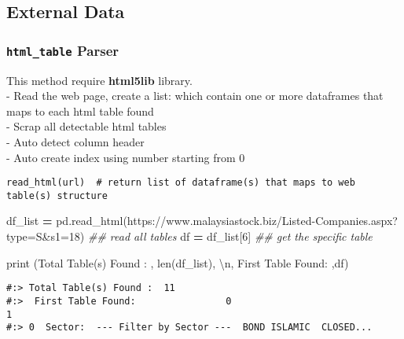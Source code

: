 \documentclass[
]{book}
\newenvironment{Shaded}{\begin{snugshade}}{\end{snugshade}}
\newcommand{\BuiltInTok}[1]{#1}
\newcommand{\CharTok}[1]{\textcolor[rgb]{0.5,0.5,0.5}{#1}}
\newcommand{\CommentTok}[1]{\textcolor[rgb]{0.37,0.37,0.37}{\textit{#1}}}
\newcommand{\DecValTok}[1]{\textcolor[rgb]{0.06,0.06,0.06}{#1}}
\newcommand{\NormalTok}[1]{#1}
\newcommand{\OperatorTok}[1]{\textcolor[rgb]{0.43,0.43,0.43}{\textbf{#1}}}
\newcommand{\StringTok}[1]{\textcolor[rgb]{0.5,0.5,0.5}{#1}}
\begin{document}
\hypertarget{external-data}{%
\subsection{External Data}\label{external-data}}

\hypertarget{html_table-parser}{%
\subsubsection{\texorpdfstring{\texttt{html\_table} Parser}{html\_table Parser}}\label{html_table-parser}}

This method require \textbf{html5lib} library.\\
- Read the web page, create a list: which contain one or more dataframes that maps to each html table found\\
- Scrap all detectable html tables\\
- Auto detect column header\\
- Auto create index using number starting from 0

\begin{verbatim}
read_html(url)  # return list of dataframe(s) that maps to web table(s) structure
\end{verbatim}

\begin{Shaded}
\begin{Highlighting}[]
\NormalTok{df\_list }\OperatorTok{=}\NormalTok{ pd.read\_html(}\StringTok{\textquotesingle{}https://www.malaysiastock.biz/Listed{-}Companies.aspx?type=S\&s1=18\textquotesingle{}}\NormalTok{)  }\CommentTok{\#\# read all tables}
\NormalTok{df }\OperatorTok{=}\NormalTok{ df\_list[}\DecValTok{6}\NormalTok{]  }\CommentTok{\#\# get the specific table}

\BuiltInTok{print}\NormalTok{ (}\StringTok{\textquotesingle{}Total Table(s) Found : \textquotesingle{}}\NormalTok{, }\BuiltInTok{len}\NormalTok{(df\_list), }\StringTok{\textquotesingle{}}\CharTok{\textbackslash{}n}\StringTok{\textquotesingle{}}\NormalTok{,}
       \StringTok{\textquotesingle{}First Table Found:      \textquotesingle{}}\NormalTok{,df)}
\end{Highlighting}
\end{Shaded}

\begin{verbatim}
#:> Total Table(s) Found :  11 
#:>  First Table Found:                0                                                  1
#:> 0  Sector:  --- Filter by Sector ---  BOND ISLAMIC  CLOSED...
\end{verbatim}
\end{document}
